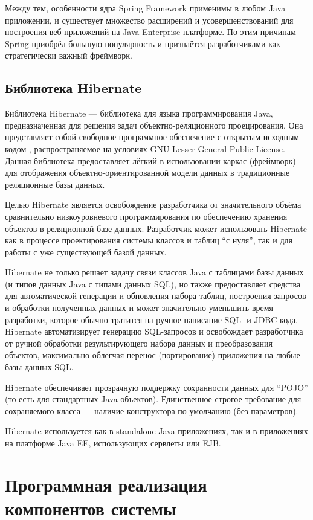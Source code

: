 \documentclass[14pt,a4paper]{reportmod}
\begin{document}
Между тем, особенности ядра Spring Framework применимы в любом Java приложении, и существует множество расширений и усовершенствований для построения веб-приложений на Java Enterprise платформе. По этим причинам Spring приобрёл большую популярность и признаётся разработчиками как стратегически важный фреймворк.

\subsection{Библиотека Hibernate}
Библиотека Hibernate --- библиотека для языка программирования Java, предназначенная для решения задач объектно-реляционного проецирования. Она представляет собой свободное программное обеспечение с открытым исходным кодом , распространяемое на условиях GNU Lesser General Public License. Данная библиотека предоставляет лёгкий в использовании каркас (фреймворк) для отображения объектно-ориентированной модели данных в традиционные реляционные базы данных.


Целью Hibernate является освобождение разработчика от значительного объёма сравнительно низкоуровневого программирования по обеспечению хранения объектов в реляционной базе данных. Разработчик может использовать Hibernate как в процессе проектирования системы классов и таблиц ``с нуля'', так и для работы с уже существующей базой данных.


Hibernate не только решает задачу связи классов Java с таблицами базы данных (и типов данных Java с типами данных SQL), но также предоставляет средства для автоматической генерации и обновления набора таблиц, построения запросов и обработки полученных данных и может значительно уменьшить время разработки, которое обычно тратится на ручное написание SQL- и JDBC-кода. Hibernate автоматизирует генерацию SQL-запросов и освобождает разработчика от ручной обработки результирующего набора данных и преобразования объектов, максимально облегчая перенос (портирование) приложения на любые базы данных SQL.


Hibernate обеспечивает прозрачную поддержку сохранности данных  для ``POJO'' (то есть для стандартных Java-объектов). Единственное строгое требование для сохраняемого класса --- наличие конструктора по умолчанию (без параметров).


Hibernate используется как в standalone Java-приложениях, так и в приложениях на платформе Java EE, использующих сервлеты или EJB.

\section{Программная реализация компонентов системы}
\end{document}
